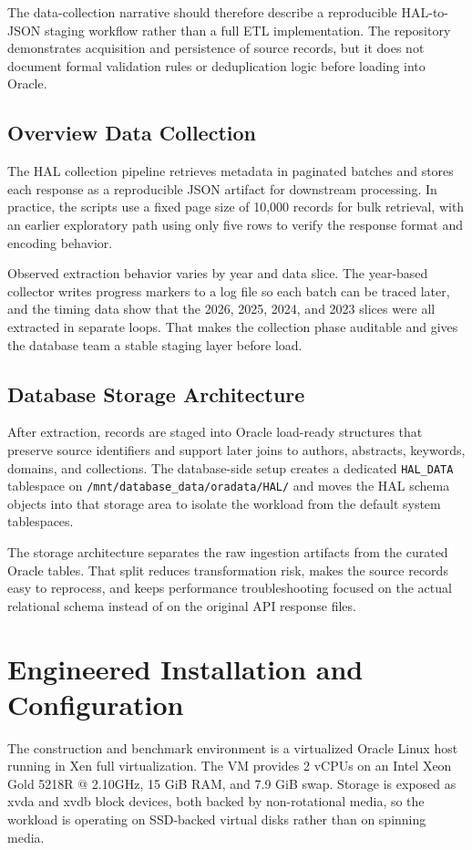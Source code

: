 \documentclass[conference]{IEEEtran}
\begin{document}
The data-collection narrative should therefore describe a reproducible HAL-to-JSON staging workflow rather than a full ETL implementation. The repository demonstrates acquisition and persistence of source records, but it does not document formal validation rules or deduplication logic before loading into Oracle.

\subsection{ Overview Data Collection}
The HAL collection pipeline retrieves metadata in paginated batches and stores each response as a reproducible JSON artifact for downstream processing. In practice, the scripts use a fixed page size of 10,000 records for bulk retrieval, with an earlier exploratory path using only five rows to verify the response format and encoding behavior.

Observed extraction behavior varies by year and data slice. The year-based collector writes progress markers to a log file so each batch can be traced later, and the timing data show that the 2026, 2025, 2024, and 2023 slices were all extracted in separate loops. That makes the collection phase auditable and gives the database team a stable staging layer before load.

\subsection{ Database Storage Architecture }
After extraction, records are staged into Oracle load-ready structures that preserve source identifiers and support later joins to authors, abstracts, keywords, domains, and collections. The database-side setup creates a dedicated \verb|HAL_DATA| tablespace on \verb|/mnt/database_data/oradata/HAL/| and moves the HAL schema objects into that storage area to isolate the workload from the default system tablespaces.

The storage architecture separates the raw ingestion artifacts from the curated Oracle tables. That split reduces transformation risk, makes the source records easy to reprocess, and keeps performance troubleshooting focused on the actual relational schema instead of on the original API response files.
\section{Engineered Installation and Configuration}
The construction and benchmark environment is a virtualized Oracle Linux host running in Xen full virtualization. The VM provides 2 vCPUs on an Intel Xeon Gold 5218R @ 2.10GHz, 15 GiB RAM, and 7.9 GiB swap. Storage is exposed as xvda and xvdb block devices, both backed by non-rotational media, so the workload is operating on SSD-backed virtual disks rather than on spinning media.
\end{document}

